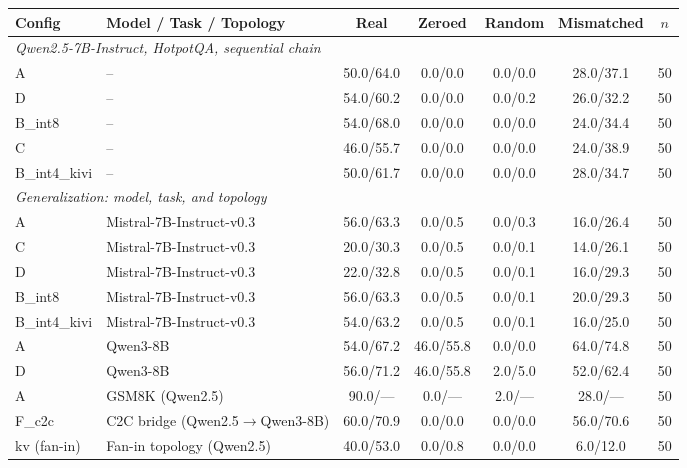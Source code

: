 \documentclass[11pt]{article}
\begin{document}
\begin{table}[t]
\centering
\small
\begin{tabular}{llccccc}
\toprule
\textbf{Config} & \textbf{Model / Task / Topology} & \textbf{Real} & \textbf{Zeroed} & \textbf{Random} & \textbf{Mismatched} & \textbf{$n$} \\
\midrule
\multicolumn{7}{l}{\emph{Qwen2.5-7B-Instruct, HotpotQA, sequential chain}} \\
A             & --                           & 50.0/64.0 & 0.0/0.0  & 0.0/0.0  & 28.0/37.1 & 50 \\
D             & --                           & 54.0/60.2 & 0.0/0.0  & 0.0/0.2  & 26.0/32.2 & 50 \\
B\_int8       & --                           & 54.0/68.0 & 0.0/0.0  & 0.0/0.0  & 24.0/34.4 & 50 \\
C             & --                           & 46.0/55.7 & 0.0/0.0  & 0.0/0.0  & 24.0/38.9 & 50 \\
B\_int4\_kivi & --                           & 50.0/61.7 & 0.0/0.0  & 0.0/0.0  & 28.0/34.7 & 50 \\
\midrule
\multicolumn{7}{l}{\emph{Generalization: model, task, and topology}} \\
A             & Mistral-7B-Instruct-v0.3     & 56.0/63.3 & 0.0/0.5  & 0.0/0.3  & 16.0/26.4 & 50 \\
C             & Mistral-7B-Instruct-v0.3     & 20.0/30.3 & 0.0/0.5  & 0.0/0.1  & 14.0/26.1 & 50 \\
D             & Mistral-7B-Instruct-v0.3     & 22.0/32.8 & 0.0/0.5  & 0.0/0.1  & 16.0/29.3 & 50 \\
B\_int8       & Mistral-7B-Instruct-v0.3     & 56.0/63.3 & 0.0/0.5  & 0.0/0.1  & 20.0/29.3 & 50 \\
B\_int4\_kivi & Mistral-7B-Instruct-v0.3     & 54.0/63.2 & 0.0/0.5  & 0.0/0.1  & 16.0/25.0 & 50 \\
A             & Qwen3-8B                     & 54.0/67.2 & 46.0/55.8& 0.0/0.0  & 64.0/74.8 & 50 \\
D             & Qwen3-8B                     & 56.0/71.2 & 46.0/55.8& 2.0/5.0  & 52.0/62.4 & 50 \\
A             & GSM8K (Qwen2.5)              & 90.0/---  & 0.0/---  & 2.0/---  & 28.0/---  & 50 \\
F\_c2c        & C2C bridge (Qwen2.5$\to$Qwen3-8B) & 60.0/70.9 & 0.0/0.0 & 0.0/0.0 & 56.0/70.6 & 50 \\
kv (fan-in)   & Fan-in topology (Qwen2.5)    & 40.0/53.0 & 0.0/0.8  & 0.0/0.0  & 6.0/12.0  & 50 \\

\end{tabular}
\end{table}
\end{document}
